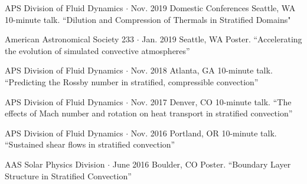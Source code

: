 \begin{cventries}

  \cventry
    {APS Division of Fluid Dynamics $\cdot$ Nov. 2019} %
    {Domestic Conferences} %
    {} %
    {Seattle, WA} %
    {10-minute talk. ``Dilution and Compression of Thermals in Stratified Domains"}

  \cventry
    {American Astronomical Society 233 $\cdot$ Jan. 2019} 
    {} 
    {} 
    {Seattle, WA} %
    {Poster. ``Accelerating the evolution of simulated convective atmospheres''} %

  \cventry
    {APS Division of Fluid Dynamics $\cdot$ Nov. 2018}
    {}
    {}
    {Atlanta, GA}
    {10-minute talk. ``Predicting the Rossby number in stratified, compressible convection''}

  \cventry
    {APS Division of Fluid Dynamics $\cdot$ Nov. 2017}
    {}
    {}
    {Denver, CO}
    {10-minute talk. ``The effects of Mach number and rotation on heat transport in stratified convection''}

  \cventry
    {APS Division of Fluid Dynamics $\cdot$ Nov. 2016}
    {}
    {}
    {Portland, OR}
    {10-minute talk. ``Sustained shear flows in stratified convection''}

  \cventry
    {AAS Solar Physics Division $\cdot$ June 2016}
    {}
    {}
    {Boulder, CO}
    {Poster. ``Boundary Layer Structure in Stratified Convection''}





\end{cventries}

